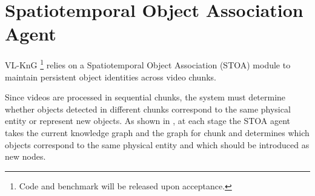 


\section{Spatiotemporal Object Association Agent}

VL-KnG \footnote{Code and benchmark will be released upon acceptance.} relies on a Spatiotemporal Object Association (STOA) module to maintain persistent object identities across video chunks.

Since videos are processed in sequential chunks, the system must determine whether objects detected in different chunks correspond to the same physical entity or represent new objects. As shown in , at each stage the STOA agent takes the current knowledge graph and the graph for chunk and determines which objects correspond to the same physical entity and which should be introduced as new nodes.

